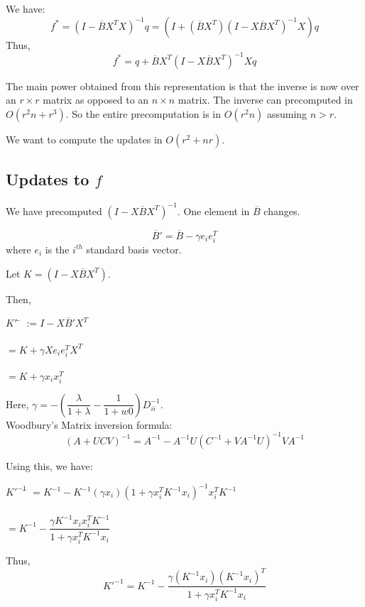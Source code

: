 \documentclass[12pt]{article}
\newcommand{\inv}[1]{#1^{-1}}
\begin{document}
		We have: 
		$$f^* = \inv{(I - \overline{B} X^TX)}q =(I+(\overline{B}X^T)\inv{(I-X\overline{B}X^T)}X)q$$
		Thus,
		\begin{equation}
			f^* = q + \overline{B}X^T\inv{(I-X\overline{B}X^T)}Xq
		\end{equation}

		The main power obtained from this representation is that the inverse is now over an $r \times r$ matrix as opposed to an $n \times n$ matrix.
		The inverse can precomputed in $O(r^2n + r^3)$. 
		So the entire precomputation is in $O(r^2n)$ assuming $n > r$.

		We want to compute the updates in $O(r^2 + nr)$.

		\subsection{Updates to $f$}

			We have precomputed $\inv{(I-X\overline{B}X^T)}$. One element in $\overline{B}$ changes.

			$$\overline{B}' = \overline{B} -\gamma e_i e_i^T$$
			where $e_i$ is the $i^{th}$ standard basis vector.

			Let $K = (I-X\overline{B}X^T)$.

			Then,
			\begin{tabbing} 
				$K'$ \= $:=I - X\overline{B}'X^T$\\\\
				\>$= K + \gamma X e_i e_i^T X^T$\\\\
				\>$= K + \gamma x_i x_i^T$
			\end{tabbing}
			Here, $\gamma = -\left(\dfrac{\lambda}{1+\lambda}-\dfrac{1}{1+w0}\right)\inv{D_{ii}}$.\\

			Woodbury's Matrix inversion formula: 
			$$\inv{(A+UCV)} = \inv{A} - \inv{A}U\inv{(\inv{C}+V\inv{A}U)}V\inv{A}$$

			Using this, we have:
			\begin{tabbing}
				$\inv{K'}$\= $= \inv{K} - \inv{K}(\gamma x_i)\inv{(1+ \gamma x_i^T\inv{K}x_i)}x_i^T\inv{K}$\\\\
				\>$=\inv{K} - \dfrac{\gamma\inv{K}x_i x_i^T\inv{K}}{1+\gamma x_i^T \inv{K} x_i}$
			\end{tabbing}
			Thus,
			\begin{equation}
				\inv{K'} = \inv{K} - \dfrac{\gamma(\inv{K}x_i) (\inv{K}x_i)^T}{1+\gamma x_i^T \inv{K} x_i}
			\end{equation}
\end{document}
